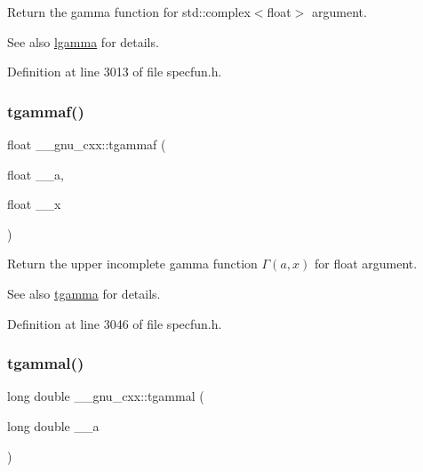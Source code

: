 Return the gamma function for {\ttfamily  std\+::complex$<$float$>$ } argument.

\begin{DoxySeeAlso}{See also}
\hyperlink{group__gnu__math__spec__func_ga40fa5127f7c419ed1d8f1c6a6f96ea9b}{lgamma} for details. 
\end{DoxySeeAlso}


Definition at line 3013 of file specfun.\+h.

\mbox{\label{group__gnu__math__spec__func_ga942773871e9c21a50cf13ec160e7e8d9}} 
\subsubsection{\texorpdfstring{tgammaf()}{tgammaf()}\hspace{0.1cm}{\footnotesize\ttfamily [3/3]}}
{\footnotesize\ttfamily float \+\_\+\+\_\+gnu\+\_\+cxx\+::tgammaf (\begin{DoxyParamCaption}\item[{float}]{\+\_\+\+\_\+a,  }\item[{float}]{\+\_\+\+\_\+x }\end{DoxyParamCaption})\hspace{0.3cm}{\ttfamily [inline]}}

Return the upper incomplete gamma function $ \Gamma(a,x) $ for {\ttfamily float} argument.

\begin{DoxySeeAlso}{See also}
\hyperlink{group__gnu__math__spec__func_ga73a634663e4eceb1e6bcf3fc16773b7b}{tgamma} for details. 
\end{DoxySeeAlso}


Definition at line 3046 of file specfun.\+h.

\mbox{\label{group__gnu__math__spec__func_ga2c7d954852d84665aabd43566d67e344}} 
\subsubsection{\texorpdfstring{tgammal()}{tgammal()}\hspace{0.1cm}{\footnotesize\ttfamily [1/3]}}
{\footnotesize\ttfamily long double \+\_\+\+\_\+gnu\+\_\+cxx\+::tgammal (\begin{DoxyParamCaption}\item[{long double}]{\+\_\+\+\_\+a }\end{DoxyParamCaption})\hspace{0.3cm}{\ttfamily [inline]}}

